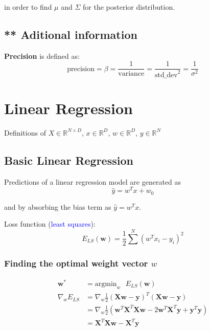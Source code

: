 \documentclass[a4paper,10pt,twoside=true,DIV=10,headsepline,plainheadsepline]{scrartcl}
\begin{document}
		in order to find $\mu$ and $\Sigma$ for the posterior distribution.
		

	\subsection{** Aditional information}
		\textbf{Precision} is defined as:
			\begin{equation}
				\textrm{precision} = \beta = \frac{1}{\textrm{variance}} = \frac{1}{\textrm{std\_dev}^2} = \frac{1}{\sigma^2}
			\end{equation}
			
	\section{Linear Regression}
		Definitions of $X \in \mathbb{R}^{N \times D} $, $x \in \mathbb{R}^{D} $, $w \in \mathbb{R}^{D} $, $y \in \mathbb{R}^{N} $
	
	\subsection{Basic Linear Regression}
	
		Predictions of a linear regression model are generated as 
			\begin{equation}
				\hat{y} = w^T x + w_0
			\end{equation} 

		and by absorbing the bias term as $\hat{y} = w^T x$.
		\newline

		Loss function (\textcolor{blue}{least squares}):
			\begin{equation}
				E_{LS}(\mathbf{w}) = \frac{1}{2} \sum^N (w^T x_i - y_i)^2
			\end{equation}

		\subsubsection{Finding the optimal weight vector $w$}
			\begin{align}
				\mathbf{w}^* &= \textrm{argmin}_w \textrm{ } E_{LS}(\mathbf{w}) \\
				\nabla_w E_{LS} &= \nabla_w \frac{1}{2} (\mathbf{X}\mathbf{w} - \mathbf{y})^T (\mathbf{X}\mathbf{w} - \mathbf{y}) \\
				&= \nabla_w \frac{1}{2} (\mathbf{w}^T \mathbf{X}^T \mathbf{X} \mathbf{w}  - 2 \mathbf{w}^T\mathbf{X}^T\mathbf{y} + \mathbf{y}^T \mathbf{y}) \\
				&= \mathbf{X}^T \mathbf{X} \mathbf{w} - \mathbf{X}^T\mathbf{y}
			\end{align}
\end{document}
